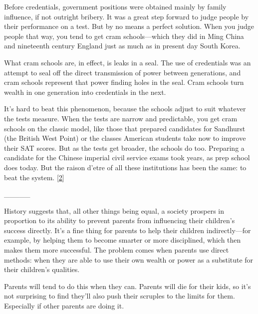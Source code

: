 Before
                  credentials, government positions were obtained mainly by
                  family influence, if not outright bribery. It was a great step
                  forward to judge people by their performance on a test. But by
                  no means a perfect solution. When you judge people that way,
                  you tend to get cram schools---which they did in Ming
                  China and nineteenth century England just as much as in
                  present day South Korea.

What cram schools are, in
                  effect, is leaks in a seal. The use of credentials was an
                  attempt to seal off the direct transmission of power between
                  generations, and cram schools represent that power finding
                  holes in the seal. Cram schools turn wealth in one generation
                  into credentials in the next.

It's hard to beat
                  this phenomenon, because the schools adjust to suit whatever
                  the tests measure. When the tests are narrow and predictable,
                  you get cram schools on the classic model, like those that
                  prepared candidates for Sandhurst (the British West Point) or
                  the classes American students take now to improve their SAT
                  scores. But as the tests get broader, the schools do too.
                  Preparing a candidate for the Chinese imperial civil service
                  exams took years, as prep school does today. But the raison
                  d'etre of all these institutions has been the same: to beat
                  the system.
                  [\href{\#f2n}{2}]


                  \_\_\_\_\_
                  

History suggests that, all other things being
                  equal, a society prospers in proportion to its ability to
                  prevent parents from influencing their children's success
                  directly. It's a fine thing for parents to help their children
                  indirectly---for example, by helping them to become
                  smarter or more disciplined, which then makes them more
                  successful. The problem comes when parents use direct methods:
                  when they are able to use their own wealth or power as a
                  substitute for their children's qualities.

Parents
                  will tend to do this when they can. Parents will die for their
                  kids, so it's not surprising to find they'll also push their
                  scruples to the limits for them. Especially if other parents
                  are doing it.

